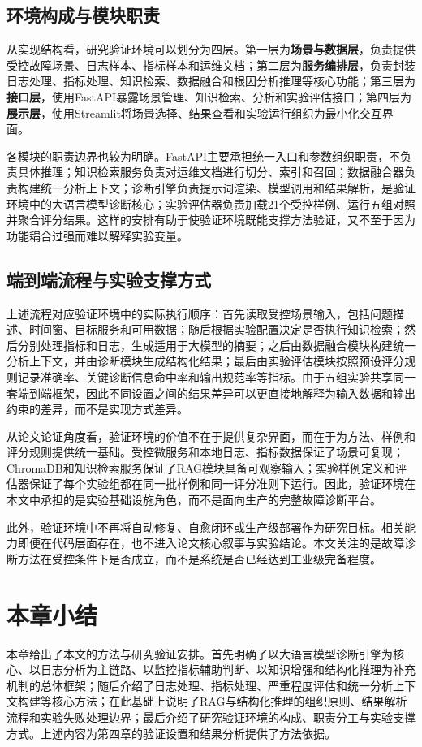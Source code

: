 \subsection{环境构成与模块职责}

从实现结构看，研究验证环境可以划分为四层。第一层为\textbf{场景与数据层}，负责提供受控故障场景、日志样本、指标样本和运维文档；第二层为\textbf{服务编排层}，负责封装日志处理、指标处理、知识检索、数据融合和根因分析推理等核心功能；第三层为\textbf{接口层}，使用FastAPI暴露场景管理、知识检索、分析和实验评估接口；第四层为\textbf{展示层}，使用Streamlit将场景选择、结果查看和实验运行组织为最小化交互界面。

各模块的职责边界也较为明确。FastAPI主要承担统一入口和参数组织职责，不负责具体推理；知识检索服务负责对运维文档进行切分、索引和召回；数据融合器负责构建统一分析上下文；诊断引擎负责提示词渲染、模型调用和结果解析，是验证环境中的大语言模型诊断核心；实验评估器负责加载21个受控样例、运行五组对照并聚合评分结果。这样的安排有助于使验证环境既能支撑方法验证，又不至于因为功能耦合过强而难以解释实验变量。

\subsection{端到端流程与实验支撑方式}

上述流程对应验证环境中的实际执行顺序：首先读取受控场景输入，包括问题描述、时间窗、目标服务和可用数据；随后根据实验配置决定是否执行知识检索；然后分别处理指标和日志，生成适用于大模型的摘要；之后由数据融合模块构建统一分析上下文，并由诊断模块生成结构化结果；最后由实验评估模块按照预设评分规则记录准确率、关键诊断信息命中率和输出规范率等指标。由于五组实验共享同一套端到端框架，因此不同设置之间的结果差异可以更直接地解释为输入数据和输出约束的差异，而不是实现方式差异。

从论文论证角度看，验证环境的价值不在于提供复杂界面，而在于为方法、样例和评分规则提供统一基础。受控微服务和本地日志、指标数据保证了场景可复现；ChromaDB和知识检索服务保证了RAG模块具备可观察输入；实验样例定义和评估器保证了每个实验组都在同一批样例和同一评分准则下运行。因此，验证环境在本文中承担的是实验基础设施角色，而不是面向生产的完整故障诊断平台。

此外，验证环境中不再将自动修复、自愈闭环或生产级部署作为研究目标。相关能力即便在代码层面存在，也不进入论文核心叙事与实验结论。本文关注的是故障诊断方法在受控条件下是否成立，而不是系统是否已经达到工业级完备程度。

\section{本章小结}

本章给出了本文的方法与研究验证安排。首先明确了以大语言模型诊断引擎为核心、以日志分析为主链路、以监控指标辅助判断、以知识增强和结构化推理为补充机制的总体框架；随后介绍了日志处理、指标处理、严重程度评估和统一分析上下文构建等核心方法；在此基础上说明了RAG与结构化推理的组织原则、结果解析流程和实验失败处理边界；最后介绍了研究验证环境的构成、职责分工与实验支撑方式。上述内容为第四章的验证设置和结果分析提供了方法依据。
